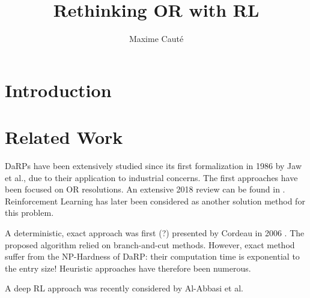 \documentclass{article}
\title{Rethinking OR with RL}
\author{Maxime Cauté}
\begin{document}
\section{Introduction}

\section{Related Work}


DaRPs have been extensively studied since its first formalization in 1986 by Jaw et al.\cite{TODO}, due to their application to industrial concerns.
The first approaches have been focused on OR resolutions.
An extensive 2018 review can be found in \cite{Ho2018}.
Reinforcement Learning has later been considered as another solution method for this problem.

A deterministic, exact approach was first (?) presented by Cordeau in 2006 \cite{TODO}.
The proposed algorithm relied on branch-and-cut methods.
However, exact method suffer from the NP-Hardness of DaRP: their computation time is exponential to the entry size!
Heuristic approaches have therefore been numerous.









A deep RL approach was recently considered by Al-Abbasi et al. \cite{TODO}

\end{document}
